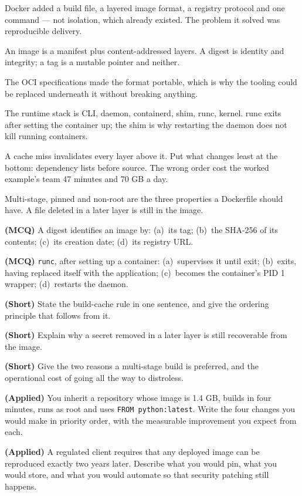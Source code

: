 \begin{chaptersummary}
\begin{tight}
  \item Docker added a build file, a layered image format, a registry protocol
        and one command --- not isolation, which already existed. The problem
        it solved was reproducible delivery.
  \item An image is a manifest plus content-addressed layers. A digest is
        identity and integrity; a tag is a mutable pointer and neither.
  \item The OCI specifications made the format portable, which is why the
        tooling could be replaced underneath it without breaking anything.
  \item The runtime stack is CLI, daemon, containerd, shim, runc, kernel. runc
        exits after setting the container up; the shim is why restarting the
        daemon does not kill running containers.
  \item A cache miss invalidates every layer above it. Put what changes least
        at the bottom: dependency lists before source. The wrong order cost
        the worked example's team 47 minutes and 70 GB a day.
  \item Multi-stage, pinned and non-root are the three properties a Dockerfile
        should have. A file deleted in a later layer is still in the image.
\end{tight}
\end{chaptersummary}

\begin{reviewq}
  \item \textbf{(MCQ)} A digest identifies an image by: (a)~its tag; (b)~the
        SHA-256 of its contents; (c)~its creation date; (d)~its registry URL.
  \item \textbf{(MCQ)} \texttt{runc}, after setting up a container:
        (a)~supervises it until exit; (b)~exits, having replaced itself with
        the application; (c)~becomes the container's PID 1 wrapper;
        (d)~restarts the daemon.
  \item \textbf{(Short)} State the build-cache rule in one sentence, and give
        the ordering principle that follows from it.
  \item \textbf{(Short)} Explain why a secret removed in a later layer is still
        recoverable from the image.
  \item \textbf{(Short)} Give the two reasons a multi-stage build is preferred,
        and the operational cost of going all the way to distroless.
  \item \textbf{(Applied)} You inherit a repository whose image is 1.4 GB,
        builds in four minutes, runs as root and uses \texttt{FROM
        python:latest}. Write the four changes you would make in priority
        order, with the measurable improvement you expect from each.
  \item \textbf{(Applied)} A regulated client requires that any deployed image
        can be reproduced exactly two years later. Describe what you would pin,
        what you would store, and what you would automate so that security
        patching still happens.
\end{reviewq}
